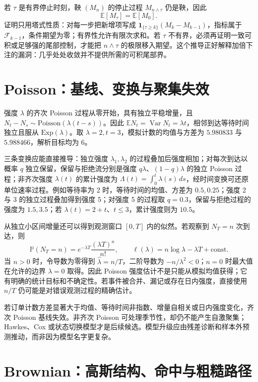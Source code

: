 若 $\tau$ 是有界停止时刻，鞅 $(M_n)$ 的停止过程
$M_{n\wedge\tau}$ 仍是鞅，因此
\[
  \mathbb E[M_\tau]=\mathbb E[M_0].
\]
证明只用塔式性质：对每一步把新增项写成
$\mathbf1_{\{\tau\ge k\}}(M_k-M_{k-1})$，指标属于 $\mathcal F_{k-1}$，条件期望为零；有界性允许有限次求和。若 $\tau$ 不有界，必须再证明一致可积或足够强的尾部控制，才能把 $n\wedge\tau$ 的极限移入期望。这个推导正好解释加倍下注的漏洞：几乎处处收敛并不提供所需的可积尾部界。

\section{Poisson：基线、变换与聚集失效}

强度 $\lambda$ 的齐次 Poisson 过程从零开始，具有独立平稳增量，且 $N_t-N_s\sim\mathrm{Poisson}(\lambda(t-s))$。因此 $\mathbb E N_t=\operatorname{Var}N_t=\lambda t$，相邻到达等待时间独立且服从 $\mathrm{Exp}(\lambda)$。取 $\lambda=2,t=3$，模拟计数的均值与方差为 $5.980833$ 与 $5.988466$，解析目标均为 6。

三条变换应能直接推导：独立强度 $\lambda_1,\lambda_2$ 的过程叠加后强度相加；对每次到达以概率 $q$ 独立保留，保留与拒绝流分别是强度 $q\lambda$、$(1-q)\lambda$ 的独立 Poisson 过程；非齐次强度 $\lambda(t)$ 的累计强度为 $\Lambda(t)=\int_0^t\lambda(s)\,ds$，经时间变换可还原单位速率过程。例如等待率为 2 时，等待时间的均值、方差为 $0.5,0.25$；强度 2 与 3 的独立过程叠加得到强度 5；对强度 5 的过程取 $q=0.3$，保留与拒绝过程的强度为 $1.5,3.5$；若 $\lambda(t)=2+t$、$t\le3$，累计强度则为 $10.5$。

从独立小区间增量还可以得到观测窗口 $[0,T]$ 内的似然。若观察到 $N_T=n$ 次到达，则
\[
 \mathbb P(N_T=n)=e^{-\lambda T}\frac{(\lambda T)^n}{n!},
 \qquad
 \ell(\lambda)=n\log\lambda-\lambda T+\text{const}.
\]
当 $n>0$ 时，令导数为零得到 $\widehat\lambda=n/T$，二阶导数为 $-n/\lambda^2<0$；$n=0$ 时最大值在允许的边界 $\lambda=0$ 取得。因此 Poisson 强度估计不是只能从模拟均值获得；它有明确的统计目标和不确定性。若事件被合并、漏记或存在日内强度，直接使用 $n/T$ 仍可能是对错误观测过程的精确估计。

若订单计数方差显著大于均值、等待时间非指数、增量自相关或日内强度变化，齐次 Poisson 基线失效。非齐次 Poisson 可处理季节性，却仍不能产生自激聚集；Hawkes、Cox 或状态切换模型才是后续候选。模型升级应由残差诊断和样本外预测推动，而非因为模型名字更复杂。

\section{Brownian：高斯结构、命中与粗糙路径}

